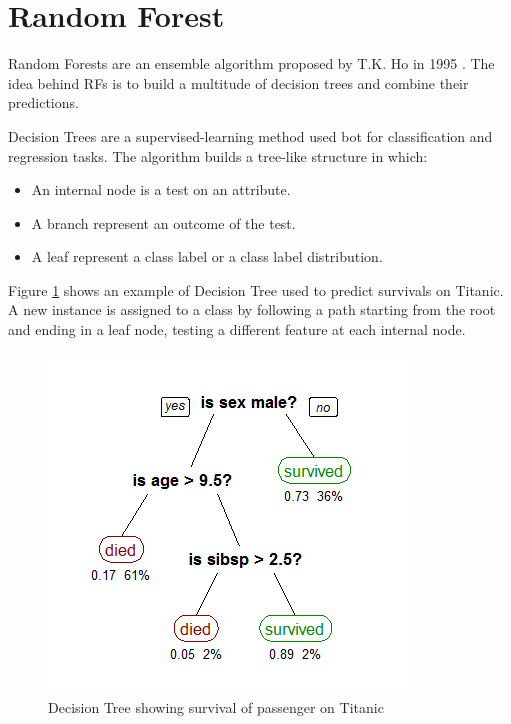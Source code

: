 \section{Random Forest}
\label{sec:random_forest}
Random Forests are an ensemble algorithm proposed by T.K. Ho in 1995 \cite{random_forest}. The idea behind \acp{RF} is to build a multitude of decision trees and combine their predictions.

\noindent Decision Trees are a supervised-learning method used bot for classification and regression tasks. The algorithm builds a tree-like structure in which:
\begin{itemize}
    \item An internal node is a test on an attribute.
    \item A branch represent an outcome of the test.
    \item A leaf represent a class label or a class label distribution.
\end{itemize}


\noindent Figure \ref{fig:thirteenth_figure} shows an example of Decision Tree used to predict survivals on Titanic. A new instance is assigned to a class by following a path starting from the root and ending in a leaf node, testing a different feature at each internal node.

\begin{figure}[htbp!]
\centering
\includegraphics[scale=0.7]{Tesi/images/CART_tree_titanic_survivors.png}
\caption{Decision Tree showing survival of passenger on Titanic \cite{pict}}
\label{fig:thirteenth_figure}
\end{figure}
  
